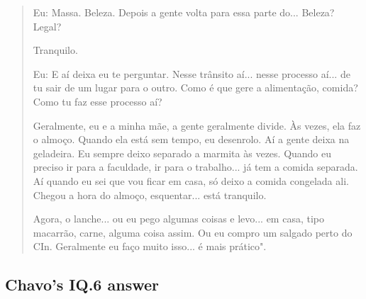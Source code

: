 \begin{quote}
    \colorbox{black!15}{Eu: Massa. Beleza. Depois a gente volta para essa parte do... Beleza? Legal?}
    
    Tranquilo.
    
    \colorbox{black!15}{Eu: E aí deixa eu te perguntar. Nesse trânsito aí... nesse processo aí... de tu sair} \colorbox{black!15}{de um lugar para o outro. Como é que gere a alimentação, comida? Como tu faz} \colorbox{black!15}{esse processo aí?}
    
    Geralmente, eu e a minha mãe, a gente geralmente divide. Às vezes, ela faz o almoço. Quando ela está sem tempo, eu desenrolo. Aí a gente deixa na geladeira. Eu sempre deixo separado a marmita às vezes. Quando eu preciso ir para a faculdade, ir para o trabalho... já tem a comida separada. Aí quando eu sei que vou ficar em casa, só deixo a comida congelada ali. Chegou a hora do almoço, esquentar... está tranquilo. 
    
    Agora, o lanche... ou eu pego algumas coisas e levo... em casa, tipo macarrão, carne, alguma coisa assim. Ou eu compro um salgado perto do \gls{CIn}. Geralmente eu faço muito isso... é mais prático".
\end{quote}

\subsection{Chavo’s IQ.6 answer}
\label{interview-exc-ss:chavo-iq6}

